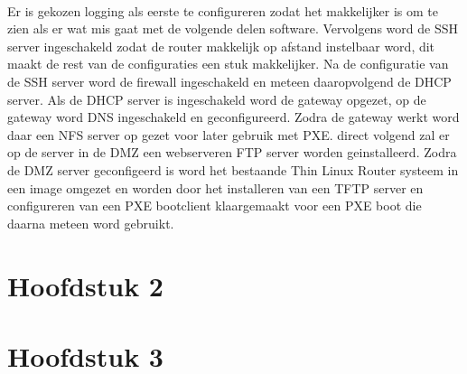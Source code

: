 \documentclass[12pt]{article}
\begin{document}
\paragraph{}
Er is gekozen logging als eerste te configureren zodat het makkelijker is om te zien als er wat mis gaat met de volgende delen software. Vervolgens word de SSH server ingeschakeld zodat de router makkelijk op afstand instelbaar word, dit maakt de rest van de configuraties een stuk makkelijker. Na de configuratie van de SSH server word de firewall ingeschakeld en meteen daaropvolgend de DHCP server. Als de DHCP server is ingeschakeld word de gateway opgezet, op de gateway word DNS ingeschakeld en geconfigureerd. Zodra de gateway werkt word daar een NFS server op gezet voor later gebruik met PXE. direct volgend zal er op de server in de DMZ een webserveren FTP server worden geinstalleerd. Zodra de DMZ server geconfigeerd is word het bestaande Thin Linux Router systeem in een image omgezet en worden door het installeren van een TFTP server en configureren van een PXE bootclient klaargemaakt voor een PXE boot die daarna meteen word gebruikt.
\section{Hoofdstuk 2}
\lipsum[0-4]
\section{Hoofdstuk 3}
\lipsum[0-4]
\clearpage 
\end{document}
